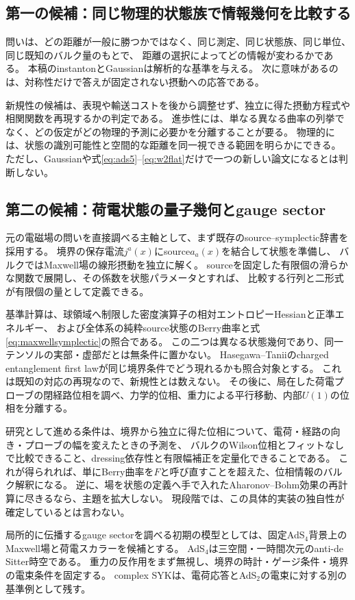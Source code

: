 \documentclass[a4paper,11pt]{ltjsarticle}
\numberwithin{equation}{section}
\begin{document}
\subsection{第一の候補：同じ物理的状態族で情報幾何を比較する}
問いは、どの距離が一般に勝つかではなく、同じ測定、同じ状態族、同じ単位、同じ既知のバルク量のもとで、
距離の選択によってどの情報が変わるかである。
本稿のinstantonとGaussianは解析的な基準を与える。
次に意味があるのは、対称性だけで答えが固定されない摂動への応答である。

新規性の候補は、表現や輸送コストを後から調整せず、独立に得た摂動方程式や相関関数を再現するかの判定である。
進歩性には、単なる異なる曲率の列挙でなく、どの仮定がどの物理的予測に必要かを分離することが要る。
物理的には、状態の識別可能性と空間的な距離を同一視できる範囲を明らかにできる。
ただし、Gaussianや式\eqref{eq:ads5}--\eqref{eq:w2flat}だけで一つの新しい論文になるとは判断しない。

\subsection{第二の候補：荷電状態の量子幾何とgauge sector}
元の電磁場の問いを直接調べる主軸として、まず既存のsource--symplectic辞書\cite{BLS,Changing}を採用する。
境界の保存電流$j^a(x)$にsource$a_a(x)$を結合して状態を準備し、
バルクではMaxwell場の線形摂動を独立に解く。
sourceを固定した有限個の滑らかな関数で展開し、その係数を状態パラメータとすれば、
比較する行列と二形式が有限個の量として定義できる。

基準計算は、球領域へ制限した密度演算子の相対エントロピーHessianと正準エネルギー、
および全体系の純粋source状態のBerry曲率と式\eqref{eq:maxwellsymplectic}の照合である。
この二つは異なる状態幾何であり、同一テンソルの実部・虚部だとは無条件に置かない。
Hasegawa--Taniiのcharged entanglement first lawが同じ境界条件でどう現れるかも照合対象とする。
これは既知の対応の再現なので、新規性とは数えない。
その後に、局在した荷電プローブの閉経路位相を調べ、力学的位相、重力による平行移動、内部$U(1)$の位相を分離する。

研究として進める条件は、境界から独立に得た位相について、電荷・経路の向き・プローブの幅を変えたときの予測を、
バルクのWilson位相とフィットなしで比較できること、dressing依存性と有限幅補正を定量化できることである。
これが得られれば、単にBerry曲率を$F$と呼び直すことを超えた、位相情報のバルク解釈になる。
逆に、場を状態の定義へ手で入れたAharonov--Bohm効果の再計算に尽きるなら、主題を拡大しない。
現段階では、この具体的実装の独自性が確定しているとは言わない。

局所的に伝播するgauge sectorを調べる初期の模型としては、固定AdS$_4$背景上のMaxwell場と荷電スカラーを候補とする。
AdS$_4$は三空間・一時間次元のanti-de Sitter時空である。
重力の反作用をまず無視し、境界の時計・ゲージ条件・境界の電束条件を固定する。
complex SYKは、電荷応答とAdS$_2$の電束に対する別の基準例として残す。
\end{document}
